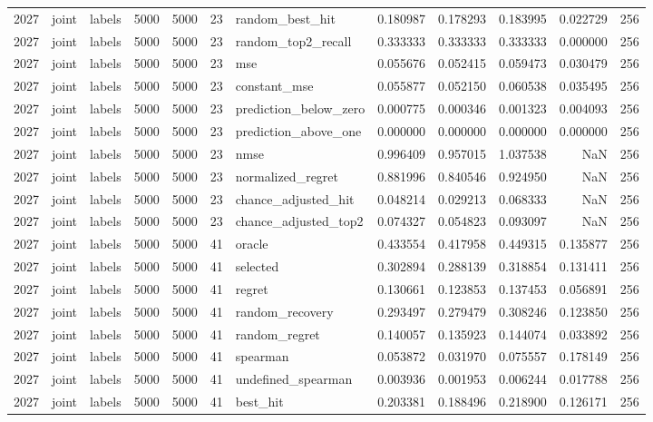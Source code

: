 \begin{tabular}{rllrrrlrrrrr}
2027 & joint & labels & 5000 & 5000 & 23 & random_best_hit & 0.180987 & 0.178293 & 0.183995 & 0.022729 & 256 \\
2027 & joint & labels & 5000 & 5000 & 23 & random_top2_recall & 0.333333 & 0.333333 & 0.333333 & 0.000000 & 256 \\
2027 & joint & labels & 5000 & 5000 & 23 & mse & 0.055676 & 0.052415 & 0.059473 & 0.030479 & 256 \\
2027 & joint & labels & 5000 & 5000 & 23 & constant_mse & 0.055877 & 0.052150 & 0.060538 & 0.035495 & 256 \\
2027 & joint & labels & 5000 & 5000 & 23 & prediction_below_zero & 0.000775 & 0.000346 & 0.001323 & 0.004093 & 256 \\
2027 & joint & labels & 5000 & 5000 & 23 & prediction_above_one & 0.000000 & 0.000000 & 0.000000 & 0.000000 & 256 \\
2027 & joint & labels & 5000 & 5000 & 23 & nmse & 0.996409 & 0.957015 & 1.037538 & NaN & 256 \\
2027 & joint & labels & 5000 & 5000 & 23 & normalized_regret & 0.881996 & 0.840546 & 0.924950 & NaN & 256 \\
2027 & joint & labels & 5000 & 5000 & 23 & chance_adjusted_hit & 0.048214 & 0.029213 & 0.068333 & NaN & 256 \\
2027 & joint & labels & 5000 & 5000 & 23 & chance_adjusted_top2 & 0.074327 & 0.054823 & 0.093097 & NaN & 256 \\
2027 & joint & labels & 5000 & 5000 & 41 & oracle & 0.433554 & 0.417958 & 0.449315 & 0.135877 & 256 \\
2027 & joint & labels & 5000 & 5000 & 41 & selected & 0.302894 & 0.288139 & 0.318854 & 0.131411 & 256 \\
2027 & joint & labels & 5000 & 5000 & 41 & regret & 0.130661 & 0.123853 & 0.137453 & 0.056891 & 256 \\
2027 & joint & labels & 5000 & 5000 & 41 & random_recovery & 0.293497 & 0.279479 & 0.308246 & 0.123850 & 256 \\
2027 & joint & labels & 5000 & 5000 & 41 & random_regret & 0.140057 & 0.135923 & 0.144074 & 0.033892 & 256 \\
2027 & joint & labels & 5000 & 5000 & 41 & spearman & 0.053872 & 0.031970 & 0.075557 & 0.178149 & 256 \\
2027 & joint & labels & 5000 & 5000 & 41 & undefined_spearman & 0.003936 & 0.001953 & 0.006244 & 0.017788 & 256 \\
2027 & joint & labels & 5000 & 5000 & 41 & best_hit & 0.203381 & 0.188496 & 0.218900 & 0.126171 & 256 \\

\end{tabular}
